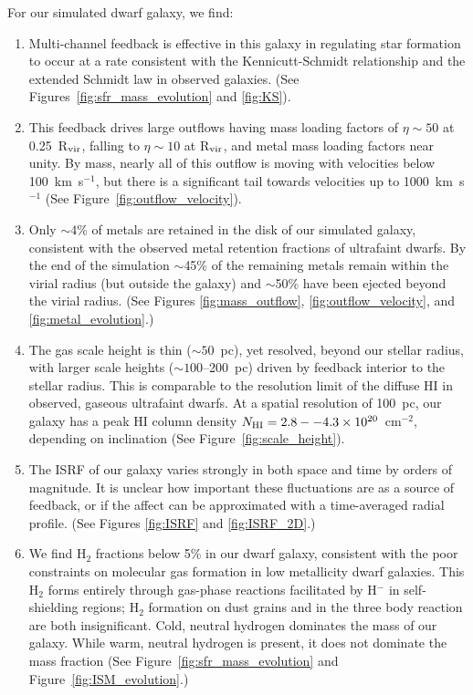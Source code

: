 \documentclass[fleqn,usenatbib,useAMS]{mnras}
\begin{document}
For our simulated dwarf galaxy, we find:
\begin{enumerate}
\item Multi-channel feedback is effective in this galaxy in regulating star formation to occur at a rate consistent with the Kennicutt-Schmidt relationship and the extended Schmidt law in observed galaxies. (See Figures~\ref{fig:sfr_mass_evolution} and \ref{fig:KS}).

\item This feedback drives large outflows having mass loading factors of $\eta \sim 50$ at 0.25~R$_{\rm vir}$, falling to $\eta \sim 10$ at R$_{\rm vir}$,  and
metal mass loading factors near unity. By mass, nearly all of this outflow is moving with velocities below 100~km~s$^{-1}$, but there is a significant tail towards velocities up to 1000~km~s$^{-1}$ (See Figure~\ref{fig:outflow_velocity}). 

\item 
Only $\sim$4\% of metals are retained in the disk of our simulated galaxy, consistent with the observed metal retention fractions of ultrafaint dwarfs.  By the end of the simulation $\sim$45\% of the remaining metals remain within the virial radius (but outside the galaxy) and $\sim$50\% 
have been ejected beyond the virial radius. (See Figures \ref{fig:mass_outflow}, \ref{fig:outflow_velocity}, and \ref{fig:metal_evolution}.)

\item 
The gas scale height is thin ($\sim 50$~pc), yet resolved, 
beyond our stellar radius, with larger scale heights ($\sim 100$--200~pc) driven by feedback interior to the stellar radius. This is comparable to the resolution limit of the diffuse HI in observed, gaseous ultrafaint dwarfs. At a spatial resolution of 100~pc, our galaxy has a peak HI column density $N_{\rm HI} = 2.8--4.3 \times 10^{20}$~cm$^{-2}$, depending on inclination (See Figure~\ref{fig:scale_height}).

\item The ISRF of our galaxy varies strongly in both space and time by orders of magnitude. It is unclear how important these fluctuations are as a source of feedback, or if the affect can be approximated with a time-averaged radial profile. (See Figures \ref{fig:ISRF} and \ref{fig:ISRF_2D}.)

\item 
We find H$_2$ fractions below 5\% in our dwarf galaxy, consistent with the poor constraints on molecular gas formation in low metallicity dwarf galaxies. This H$_2$ forms entirely through gas-phase reactions facilitated by H$^{-}$ in self-shielding regions; H$_2$ formation on dust grains and in the three body reaction are both insignificant. Cold, neutral hydrogen dominates the mass of our galaxy. While warm, neutral hydrogen is present, it does not dominate the mass fraction (See Figure~\ref{fig:sfr_mass_evolution} and Figure~\ref{fig:ISM_evolution}.)


\end{enumerate}
\end{document}
